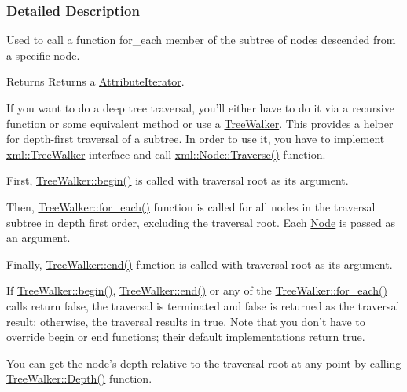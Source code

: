 \subsubsection{Detailed Description}
Used to call a function for\_\-each member of the subtree of nodes descended from a specific node. \begin{DoxyReturn}{Returns}
Returns a \hyperlink{classMezzanine_1_1xml_1_1AttributeIterator}{AttributeIterator}.
\end{DoxyReturn}
If you want to do a deep tree traversal, you'll either have to do it via a recursive function or some equivalent method or use a \hyperlink{classMezzanine_1_1xml_1_1TreeWalker}{TreeWalker}. This provides a helper for depth-\/first traversal of a subtree. In order to use it, you have to implement \hyperlink{classMezzanine_1_1xml_1_1TreeWalker}{xml::TreeWalker} interface and call \hyperlink{classMezzanine_1_1xml_1_1Node_a3115c4b78afaa9b27a54c1d4200dbcc7}{xml::Node::Traverse()} function. \par
\par
 First, \hyperlink{classMezzanine_1_1xml_1_1TreeWalker_a46997327b1578f172e84e0bd9e283680}{TreeWalker::begin()} is called with traversal root as its argument.\par
 Then, \hyperlink{classMezzanine_1_1xml_1_1TreeWalker_a04b563afcbeaa53cbea336b837052ef3}{TreeWalker::for\_\-each()} function is called for all nodes in the traversal subtree in depth first order, excluding the traversal root. Each \hyperlink{classMezzanine_1_1xml_1_1Node}{Node} is passed as an argument.\par
 Finally, \hyperlink{classMezzanine_1_1xml_1_1TreeWalker_a0d37b0282278bc6bc5ecd981221cade0}{TreeWalker::end()} function is called with traversal root as its argument.\par
\par
 If \hyperlink{classMezzanine_1_1xml_1_1TreeWalker_a46997327b1578f172e84e0bd9e283680}{TreeWalker::begin()}, \hyperlink{classMezzanine_1_1xml_1_1TreeWalker_a0d37b0282278bc6bc5ecd981221cade0}{TreeWalker::end()} or any of the \hyperlink{classMezzanine_1_1xml_1_1TreeWalker_a04b563afcbeaa53cbea336b837052ef3}{TreeWalker::for\_\-each()} calls return false, the traversal is terminated and false is returned as the traversal result; otherwise, the traversal results in true. Note that you don't have to override begin or end functions; their default implementations return true.\par
\par
 You can get the node's depth relative to the traversal root at any point by calling \hyperlink{classMezzanine_1_1xml_1_1TreeWalker_a24eee99cdf581398a60ee06e11775da4}{TreeWalker::Depth()} function. 

